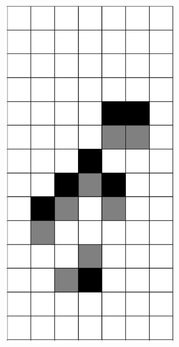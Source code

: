 \documentclass[12pt]{article}
\numberwithin{figure}{section} %
\begin{document}
\begin{figure}[H]
\begin{subfigure}{0.18\textwidth}
     		\subcaption{}
   	\end{subfigure}
     	\begin{subfigure}{0.18\textwidth}
     		\centering
     		\includegraphics[width=\linewidth]{Section4/16.1}
     		\subcaption{}
   	\end{subfigure}

\end{figure}
\end{document}
